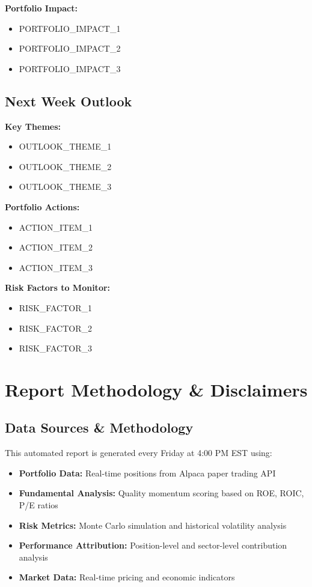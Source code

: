 \documentclass[11pt]{article}
\begin{document}
\textbf{Portfolio Impact:}
\begin{itemize}
    \item {{PORTFOLIO_IMPACT_1}}
    \item {{PORTFOLIO_IMPACT_2}}
    \item {{PORTFOLIO_IMPACT_3}}
\end{itemize}

\subsection{Next Week Outlook}

\textbf{Key Themes:}
\begin{itemize}
    \item {{OUTLOOK_THEME_1}}
    \item {{OUTLOOK_THEME_2}}
    \item {{OUTLOOK_THEME_3}}
\end{itemize}

\textbf{Portfolio Actions:}
\begin{itemize}
    \item {{ACTION_ITEM_1}}
    \item {{ACTION_ITEM_2}}
    \item {{ACTION_ITEM_3}}
\end{itemize}

\textbf{Risk Factors to Monitor:}
\begin{itemize}
    \item {{RISK_FACTOR_1}}
    \item {{RISK_FACTOR_2}}
    \item {{RISK_FACTOR_3}}
\end{itemize}

\section{Report Methodology \& Disclaimers}

\subsection{Data Sources \& Methodology}

This automated report is generated every Friday at 4:00 PM EST using:
\begin{itemize}
    \item \textbf{Portfolio Data:} Real-time positions from Alpaca paper trading API
    \item \textbf{Fundamental Analysis:} Quality momentum scoring based on ROE, ROIC, P/E ratios
    \item \textbf{Risk Metrics:} Monte Carlo simulation and historical volatility analysis
    \item \textbf{Performance Attribution:} Position-level and sector-level contribution analysis
    \item \textbf{Market Data:} Real-time pricing and economic indicators
\end{itemize}
\end{document}
